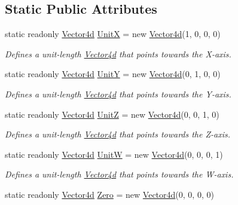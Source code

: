 \subsection*{Static Public Attributes}
\begin{DoxyCompactItemize}
\item 
static readonly \hyperlink{struct_open_t_k_1_1_vector4d}{Vector4d} \hyperlink{struct_open_t_k_1_1_vector4d_a8b680bfc1a34f35c9b6c1f86c4d13a78}{Unit\-X} = new \hyperlink{struct_open_t_k_1_1_vector4d}{Vector4d}(1, 0, 0, 0)
\begin{DoxyCompactList}\small\item\em Defines a unit-\/length \hyperlink{struct_open_t_k_1_1_vector4d}{Vector4d} that points towards the X-\/axis. \end{DoxyCompactList}\item 
static readonly \hyperlink{struct_open_t_k_1_1_vector4d}{Vector4d} \hyperlink{struct_open_t_k_1_1_vector4d_ae5a0e650e3a76c7cbb541c84d25934ac}{Unit\-Y} = new \hyperlink{struct_open_t_k_1_1_vector4d}{Vector4d}(0, 1, 0, 0)
\begin{DoxyCompactList}\small\item\em Defines a unit-\/length \hyperlink{struct_open_t_k_1_1_vector4d}{Vector4d} that points towards the Y-\/axis. \end{DoxyCompactList}\item 
static readonly \hyperlink{struct_open_t_k_1_1_vector4d}{Vector4d} \hyperlink{struct_open_t_k_1_1_vector4d_a362b8ee3aa8ea327234d5082c4320404}{Unit\-Z} = new \hyperlink{struct_open_t_k_1_1_vector4d}{Vector4d}(0, 0, 1, 0)
\begin{DoxyCompactList}\small\item\em Defines a unit-\/length \hyperlink{struct_open_t_k_1_1_vector4d}{Vector4d} that points towards the Z-\/axis. \end{DoxyCompactList}\item 
static readonly \hyperlink{struct_open_t_k_1_1_vector4d}{Vector4d} \hyperlink{struct_open_t_k_1_1_vector4d_aed38a8e576f79b30e7310255089e3e3e}{Unit\-W} = new \hyperlink{struct_open_t_k_1_1_vector4d}{Vector4d}(0, 0, 0, 1)
\begin{DoxyCompactList}\small\item\em Defines a unit-\/length \hyperlink{struct_open_t_k_1_1_vector4d}{Vector4d} that points towards the W-\/axis. \end{DoxyCompactList}\item 
static readonly \hyperlink{struct_open_t_k_1_1_vector4d}{Vector4d} \hyperlink{struct_open_t_k_1_1_vector4d_acd01e6c83590d1bd9fcc89d526f86f48}{Zero} = new \hyperlink{struct_open_t_k_1_1_vector4d}{Vector4d}(0, 0, 0, 0)

\end{DoxyCompactItemize}
